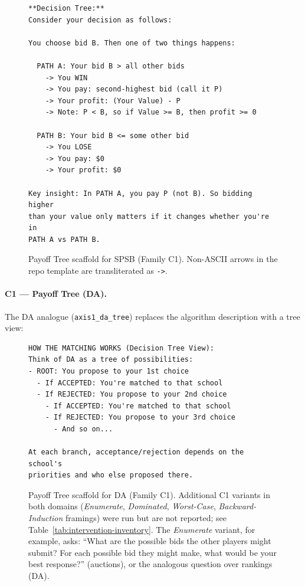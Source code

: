 \begin{figure}[H]
\begin{lstlisting}
**Decision Tree:**
Consider your decision as follows:

You choose bid B. Then one of two things happens:

  PATH A: Your bid B > all other bids
    -> You WIN
    -> You pay: second-highest bid (call it P)
    -> Your profit: (Your Value) - P
    -> Note: P < B, so if Value >= B, then profit >= 0

  PATH B: Your bid B <= some other bid
    -> You LOSE
    -> You pay: $0
    -> Your profit: $0

Key insight: In PATH A, you pay P (not B). So bidding higher
than your value only matters if it changes whether you're in
PATH A vs PATH B.
\end{lstlisting}
\caption{Payoff Tree scaffold for SPSB (Family C1). Non-ASCII arrows in the repo template are transliterated as \texttt{->}.}
\label{fig:prompt-tree-auction}
\end{figure}

\paragraph{C1 --- Payoff Tree (DA).} The DA analogue (\texttt{axis1\_da\_tree}) replaces the algorithm description with a tree view:

\begin{figure}[H]
\begin{lstlisting}
HOW THE MATCHING WORKS (Decision Tree View):
Think of DA as a tree of possibilities:
- ROOT: You propose to your 1st choice
  - If ACCEPTED: You're matched to that school
  - If REJECTED: You propose to your 2nd choice
    - If ACCEPTED: You're matched to that school
    - If REJECTED: You propose to your 3rd choice
      - And so on...

At each branch, acceptance/rejection depends on the school's
priorities and who else proposed there.
\end{lstlisting}
\caption{Payoff Tree scaffold for DA (Family C1). Additional C1 variants in both domains (\emph{Enumerate}, \emph{Dominated}, \emph{Worst-Case}, \emph{Backward-Induction} framings) were run but are not reported; see Table~\ref{tab:intervention-inventory}. The \emph{Enumerate} variant, for example, asks: ``What are the possible bids the other players might submit? For each possible bid they might make, what would be your best response?'' (auctions), or the analogous question over rankings (DA).}
\label{fig:prompt-tree-da}
\end{figure}

